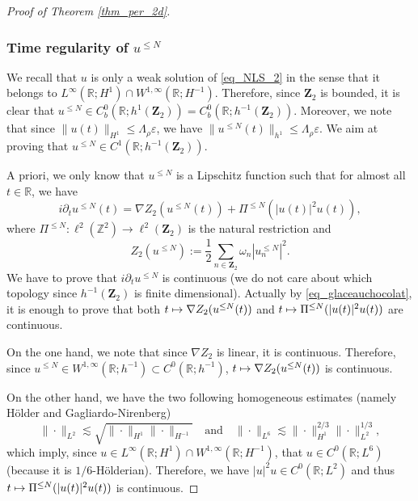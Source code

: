 \documentclass[11pt]{article}
\newcommand\mto{\mathchoice{\longmapsto}{\mapsto}{\mapsto}{\mapsto}}
\theoremstyle{definition}
\begin{document}
\begin{proof}[Proof of Theorem \ref{thm_per_2d}]
\subsubsection*{Time regularity of $u^{\leq N} $}
We recall that $u$ is only a weak solution of \eqref{eq_NLS_2} in the sense that it belongs to $L^\infty(\mathbb{R}; H^1) \cap W^{1,\infty}(\mathbb{R};H^{-1})$. Therefore, since $\mathbf{Z}_2$ is bounded, it is clear that $ u^{\leq N} \in C^0_b(\mathbb{R}; h^{1}(\mathbf{Z}_2))= C^0_b(\mathbb{R}; h^{-1}(\mathbf{Z}_2)) $. Moreover, we note that since $\| u(t) \|_{H^1}\leq \Lambda_\rho \varepsilon$, we have $\|u^{\leq N} (t) \|_{h^1} \leq \Lambda_\rho \varepsilon$. We aim at proving that $u^{\leq N} \in C^1(\mathbb{R}; h^{-1}(\mathbf{Z}_2))$.

A priori, we only know that $u^{\leq N}$ is a Lipschitz function such that for almost all $t\in\mathbb{R}$, we have
\begin{equation}
\label{eq_glaceauchocolat}
i\partial_t u^{\leq N}(t) = \nabla Z_2(u^{\leq N}(t)) + \Pi^{\leq N} (|u(t)|^2 u(t)),
\end{equation}
where $\Pi^{\leq N}: \ell^2(\mathbb{Z}^2) \to \ell^2(\mathbf{Z}_2) $ is the natural restriction and
\[
Z_2(u^{\leq N}):= \frac12 \sum_{n\in \mathbf{Z}_2} \omega_n |u_n^{\leq N}|^2.
\]
We have to prove that $i\partial_t u^{\leq N}$ is continuous (we do not care about which topology since $ h^{-1}(\mathbf{Z}_2)$ is finite dimensional). Actually by \eqref{eq_glaceauchocolat}, it is enough to prove that both $t \mto \nabla Z_2(u^{\leq N}(t))$ and $t\mto \Pi^{\leq N} (|u(t)|^2 u(t))$ are continuous.

On the one hand, we note that since $\nabla Z_2$ is linear, it is continuous. Therefore, since $u^{\leq N} \in W^{1,\infty}(\mathbb{R};h^{-1}) \subset C^0(\mathbb{R};h^{-1})$, $t \mto \nabla Z_2(u^{\leq N}(t))$ is continuous.

On the other hand, we have the two following homogeneous estimates (namely Hölder and Gagliardo-Nirenberg)
\[
\| \cdot\|_{L^2}\lesssim \sqrt{ \| \cdot\|_{H^1} \| \cdot\|_{H^{-1}}} \quad \text{and} \quad \| \cdot \|_{L^6} \lesssim \| \cdot\|_{H^1}^{2/3} \| \cdot\|_{L^2}^{1/3},
\]
which imply, since $u\in L^\infty(\mathbb{R}; H^1) \cap W^{1,\infty}(\mathbb{R};H^{-1})$, that $u\in C^0(\mathbb{R};L^6)$ (because it is $1/6$-Hölderian). Therefore, we have $|u|^2 u \in C^0(\mathbb{R};L^2)$ and thus $t\mto \Pi^{\leq N} (|u(t)|^2 u(t))$ is continuous.


\end{proof}
\end{document}
